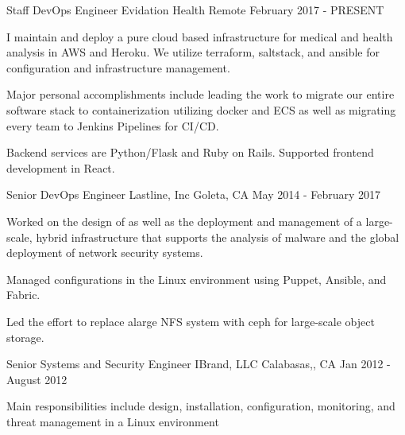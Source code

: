 
\begin{cventries}
  \cventry
    {Staff DevOps Engineer} %
    {Evidation Health} %
    {Remote} %
    {February 2017 - PRESENT} %
    {
      \begin{cvitems} %
          \item {I maintain and deploy a pure cloud based infrastructure for medical and health analysis in AWS and Heroku. We utilize terraform, saltstack, and ansible for configuration and infrastructure management.}
          \item { Major personal accomplishments include leading the work to migrate our entire software stack to containerization utilizing docker and ECS as well as migrating every team to Jenkins Pipelines for CI/CD.}
          \item {Backend services are Python/Flask and Ruby on Rails. Supported frontend development in
        React.}
      \end{cvitems}
    }

  \cventry
    {Senior DevOps Engineer} %
    {Lastline, Inc} %
    {Goleta, CA} %
    {May 2014 - February 2017} %
    {
      \begin{cvitems} %
        \item {Worked on the design of as well as the deployment and management of a large-scale, hybrid infrastructure that supports the analysis of malware and the global deployment of network security systems.}
        \item {Managed configurations in the Linux environment using Puppet, Ansible, and Fabric.}
       \item {Led the effort to replace alarge NFS system with ceph for large-scale object storage.}
      \end{cvitems}
    }

  \cventry
    {Senior Systems and Security Engineer} %
    {IBrand, LLC} %
    {Calabasas,, CA} %
    {Jan 2012 - August 2012} %
    {
      \begin{cvitems} %
        \item{Main responsibilities include design, installation, configuration, monitoring, and threat management in a Linux environment}
      \end{cvitems}
    }


\end{cventries}
